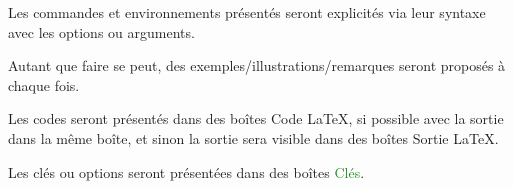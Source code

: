 \documentclass{article}
\begin{document}
\begin{codeinfo}
Les \textsf{commandes} et \textsf{environnements} présentés seront explicités via leur \textsf{syntaxe} avec les \textsf{options} ou \textsf{arguments}.

Autant que faire se peut, des exemples/illustrations/remarques seront proposés à chaque fois.

\smallskip

Les \textsf{codes} seront présentés dans des \textsf{boîtes} \textcolor{red!75!black}{{\small \faCode} Code \LaTeX}, si possible avec la \textsf{sortie} dans la même boîte, et sinon la \textsf{sortie} sera visible dans des \textsf{boîtes} \textcolor{red!75!black}{{\small \faArrowAltCircleRight[regular]} Sortie \LaTeX}.

Les \textsf{clés} ou \textsf{options} seront présentées dans des \textsf{boîtes} \textcolor{ForestGreen}{{\small \faPaperclip} Clés}.
\end{codeinfo}

%
%
\end{document}
